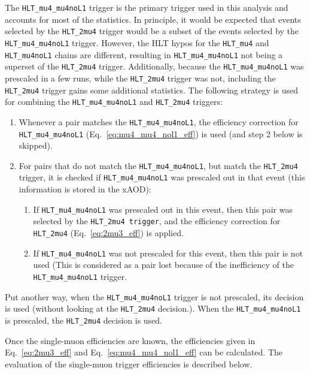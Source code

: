 The \verb=HLT_mu4_mu4noL1= trigger is the primary trigger used in this analysis
  and accounts for most of the statistics.
In principle, it would be expected that events selected by the \verb=HLT_2mu4= 
  trigger would be a subset of the events selected by the \verb=HLT_mu4_mu4noL1= trigger.
However, the HLT hypos for the \verb=HLT_mu4= and \verb=HLT_mu4noL1= 
  chains are different, resulting in \verb=HLT_mu4_mu4noL1= not being 
  a superset of the \verb=HLT_2mu4= trigger.
Additionally, because the \verb=HLT_mu4_mu4noL1= was prescaled in a few runs,
  while the \verb=HLT_2mu4= trigger was not, including the \verb=HLT_2mu4=
  trigger gains some additional statistics.
The following strategy is used for combining the \verb=HLT_mu4_mu4noL1= 
  and \verb=HLT_2mu4= triggers:
\begin{enumerate}
  \item Whenever a pair matches the \verb=HLT_mu4_mu4noL1=, the efficiency correction for \verb=HLT_mu4_mu4noL1= (Eq.~\eqref{eq:mu4_mu4_nol1_eff}) is used (and step 2 below is skipped).
  \item For pairs that do not match the  \verb=HLT_mu4_mu4noL1=, but match the \verb=HLT_2mu4= trigger, it is checked if \verb=HLT_mu4_mu4noL1= was prescaled out in that event (this information is stored in the xAOD):
  \begin{enumerate}[label=\alph*.]
    \item If \verb=HLT_mu4_mu4noL1= was prescaled out in this event, then this pair was selected by the \verb=HLT_2mu4 trigger=, and the efficiency correction for \verb=HLT_2mu4= (Eq.~\eqref{eq:2mu3_eff}) is applied.
    \item If \verb=HLT_mu4_mu4noL1= was not prescaled for this event, then this pair is not used (This is considered as a pair lost because of the inefficiency of the \verb=HLT_mu4_mu4noL1= trigger.
  \end{enumerate}
\end{enumerate}
Put another way, when the \verb=HLT_mu4_mu4noL1= trigger is not prescaled,
  its decision is used (without looking at the \verb=HLT_2mu4= decision.).
When the \verb=HLT_mu4_mu4noL1= is prescaled, the \verb=HLT_2mu4= decision is used.



Once the single-muon efficiencies are known, the efficiencies given
  in Eq.~\eqref{eq:2mu3_eff} and Eq.~\eqref{eq:mu4_mu4_nol1_eff} can be calculated.
The evaluation of the single-muon trigger efficiencies is described below.


